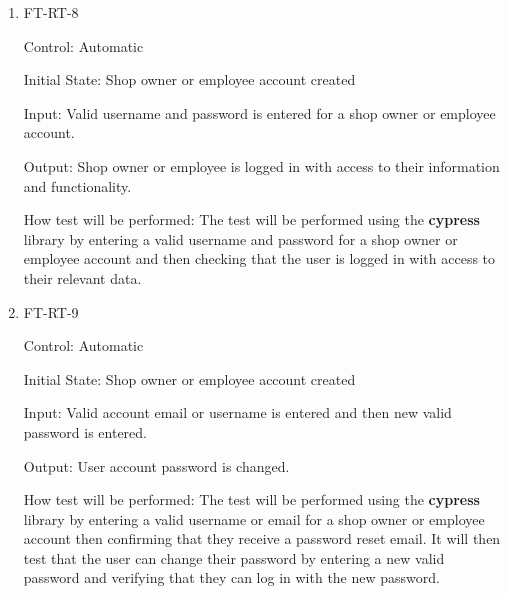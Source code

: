 \documentclass[12pt, titlepage]{article}
\begin{document}
\begin{enumerate}

\item{FT-RT-8\\}

Control: Automatic
					
Initial State: Shop owner or employee account created
					
Input: Valid username and password is entered for a shop owner or employee account.
					
Output: Shop owner or employee is logged in with access to their information and functionality.

How test will be performed: The test will be performed using the \textbf{cypress} library by entering a valid username and password for a shop owner or employee account and then checking that the user is logged in with access to their relevant data.

\item{FT-RT-9\\}

Control: Automatic
					
Initial State: Shop owner or employee account created
					
Input: Valid account email or username is entered and then new valid password is entered.
					
Output: User account password is changed.

How test will be performed: The test will be performed using the \textbf{cypress} library by entering a valid username or email for a shop owner or employee account then confirming that they receive a password reset email. It will then test that the user can change their password by entering a new valid password and verifying that they can log in with the new password.

\end{enumerate}
\end{document}
